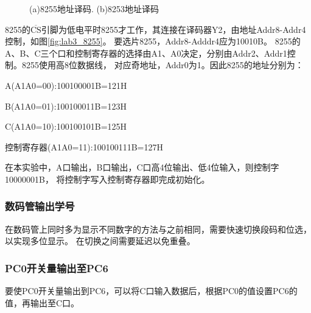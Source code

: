 \documentclass[12pt, a4paper, oneside]{ctexart}
\begin{document}
    \begin{figure}[!h]
        \centering
        \hfil
        \caption{(a)8255地址译码. (b)8253地址译码}
    \end{figure} 
    
    8255的$\overline{\text{CS}}$引脚为低电平时8255才工作，其连接在译码器Y2，由地址Addr8-Addr4控制，如图\ref{fig:lab3_8255}。
    要选片8255，Addr8-Adddr4应为10010B。
    8255的A、B、C三个口和控制寄存器的选择由A1、A0决定，分别由Addr2、Addr1控制。8255使用高8位数据线，
    对应奇地址，Addr0为1。因此8255的地址分别为：

    
    A(A1A0=00):100100001B=121H

    B(A1A0=01):100100011B=123H

    C(A1A0=10):100100101B=125H

    控制寄存器(A1A0=11):100100111B=127H

    在本实验中，A口输出，B口输出，C口高4位输出、低4位输入，则控制字10000001B，
    将控制字写入控制寄存器即完成初始化。

    \subsubsection{数码管输出学号}
    在数码管上同时多为显示不同数字的方法与之前相同，需要快速切换段码和位选，以实现多位显示。
    在切换之间需要延迟以免重叠。

    \subsubsection{PC0开关量输出至PC6}
    要使PC0开关量输出到PC6，可以将C口输入数据后，根据PC0的值设置PC6的值，再输出至C口。
    
\end{document}

